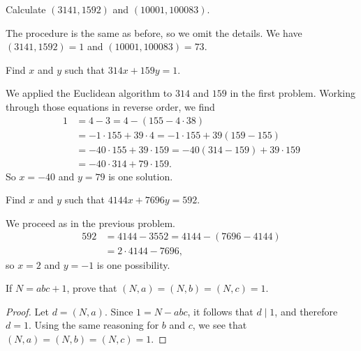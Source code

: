  Calculate $(3141, 1592)$ and $(10001, 100083)$.
\begin{solution}
  The procedure is the same as before, so we omit the details. We have
  $(3141,1592) = 1$ and $(10001, 100083) = 73$.
\end{solution}

 Find $x$ and $y$ such that $314x + 159y = 1$.
\begin{solution}
  We applied the Euclidean algorithm to $314$ and $159$ in the first
  problem. Working through those equations in reverse order, we find
  \begin{align*}
    1 &= 4 - 3 = 4 - (155 - 4\cdot38) \\
      &= -1\cdot155 + 39\cdot4 = -1\cdot155 + 39(159 - 155) \\
      &= -40\cdot155 + 39\cdot159 = -40(314 - 159) + 39\cdot159 \\
      &= -40\cdot314 + 79\cdot159.
  \end{align*}
  So $x = -40$ and $y = 79$ is one solution.
\end{solution}

 Find $x$ and $y$ such that $4144x + 7696y = 592$.
\begin{solution}
  We proceed as in the previous problem.
  \begin{align*}
    592 &= 4144 - 3552 = 4144 - (7696 - 4144) \\
        &= 2\cdot4144 - 7696,
  \end{align*}
  so $x = 2$ and $y = -1$ is one possibility.
\end{solution}

 If $N = abc + 1$, prove that $(N,a) = (N,b) = (N,c) = 1$.
\begin{proof}
  Let $d = (N,a)$. Since $1 = N - abc$, it follows that $d\mid1$, and
  therefore $d = 1$. Using the same reasoning for $b$ and $c$, we see
  that $(N,a) = (N,b) = (N,c) = 1$.
\end{proof}
